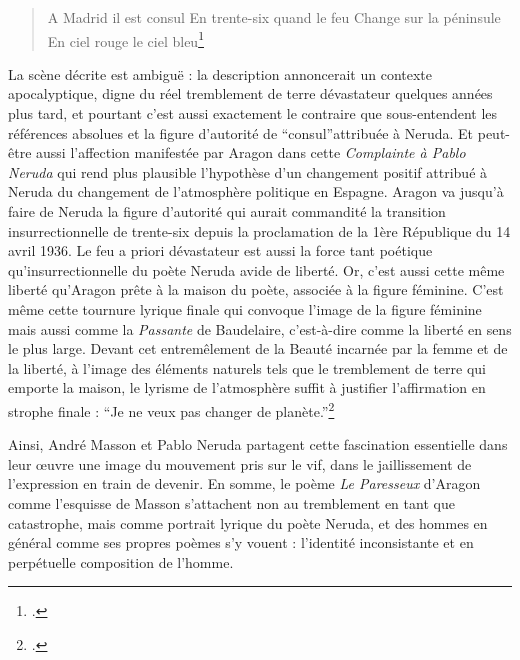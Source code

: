 \begin{verse}
A Madrid il est consul 
En trente-six quand le feu
Change sur la péninsule
En ciel rouge le ciel bleu\footcite{pabloneruda}	
\end{verse}
 
	La scène décrite est ambiguë : la description annoncerait un contexte apocalyptique, digne du réel tremblement de terre dévastateur quelques années plus tard, et pourtant c’est aussi exactement le contraire que sous-entendent les références absolues et la figure d’autorité de \enquote{consul}attribuée à Neruda. Et peut-être aussi l’affection manifestée par Aragon dans cette \emph{Complainte à Pablo Neruda} qui rend plus plausible l’hypothèse d’un changement positif attribué à Neruda du changement de l’atmosphère politique en Espagne. Aragon va jusqu'à faire de Neruda la figure d’autorité qui aurait commandité la transition insurrectionnelle de trente-six depuis la proclamation de la 1ère République du 14 avril 1936. Le feu a priori dévastateur est aussi la force tant poétique qu’insurrectionnelle du poète Neruda avide de liberté. Or, c’est aussi cette même liberté qu’Aragon prête à la maison du poète, associée à la figure féminine. C’est même cette tournure lyrique finale qui convoque l’image de la figure féminine mais aussi comme la \emph{Passante} de Baudelaire, c'est-à-dire comme la liberté en sens le plus large. Devant cet entremêlement de la Beauté incarnée par la femme et de la liberté, à l’image des éléments naturels tels que le tremblement de terre qui emporte la maison, le lyrisme de l’atmosphère suffit à justifier l’affirmation en strophe finale : \enquote{Je ne veux pas changer de planète.}\footcite{pabloneruda}

Ainsi, André Masson et Pablo Neruda partagent cette fascination essentielle dans leur \oe{}uvre une image du mouvement pris sur le vif, dans le jaillissement de l’expression en train de devenir. En somme, le poème \emph{Le Paresseux} d’Aragon comme l’esquisse de Masson s’attachent non au tremblement en tant que catastrophe, mais comme portrait lyrique du poète Neruda, et des hommes en général comme ses propres poèmes s’y vouent : l’identité inconsistante et en perpétuelle composition de l’homme.

